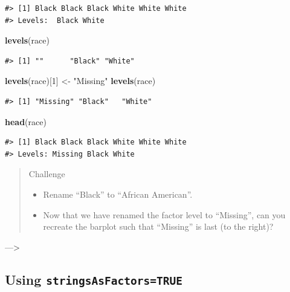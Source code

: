 \documentclass[
]{book}
\newenvironment{Shaded}{\begin{snugshade}}{\end{snugshade}}
\newcommand{\DecValTok}[1]{\textcolor[rgb]{0.00,0.00,0.81}{#1}}
\newcommand{\KeywordTok}[1]{\textcolor[rgb]{0.13,0.29,0.53}{\textbf{#1}}}
\newcommand{\NormalTok}[1]{#1}
\newcommand{\StringTok}[1]{\textcolor[rgb]{0.31,0.60,0.02}{#1}}
\providecommand{\tightlist}{%
  \setlength{\itemsep}{0pt}\setlength{\parskip}{0pt}}
\begin{document}
\begin{verbatim}
#> [1] Black Black Black White White White
#> Levels:  Black White
\end{verbatim}

\begin{Shaded}
\begin{Highlighting}[]
\KeywordTok{levels}\NormalTok{(race)}
\end{Highlighting}
\end{Shaded}

\begin{verbatim}
#> [1] ""      "Black" "White"
\end{verbatim}

\begin{Shaded}
\begin{Highlighting}[]
\KeywordTok{levels}\NormalTok{(race)[}\DecValTok{1}\NormalTok{] <-}\StringTok{ "Missing"}
\KeywordTok{levels}\NormalTok{(race)}
\end{Highlighting}
\end{Shaded}

\begin{verbatim}
#> [1] "Missing" "Black"   "White"
\end{verbatim}

\begin{Shaded}
\begin{Highlighting}[]
\KeywordTok{head}\NormalTok{(race)}
\end{Highlighting}
\end{Shaded}

\begin{verbatim}
#> [1] Black Black Black White White White
#> Levels: Missing Black White
\end{verbatim}

\begin{quote}
Challenge

\begin{itemize}
\tightlist
\item
  Rename ``Black'' to ``African American''.
\item
  Now that we have renamed the factor level to ``Missing'', can you recreate the
  barplot such that ``Missing'' is last (to the right)?
\end{itemize}
\end{quote}

---\textgreater{}

\hypertarget{using-stringsasfactorstrue}{%
\subsection{\texorpdfstring{Using \texttt{stringsAsFactors=TRUE}}{Using stringsAsFactors=TRUE}}\label{using-stringsasfactorstrue}}
\end{document}
